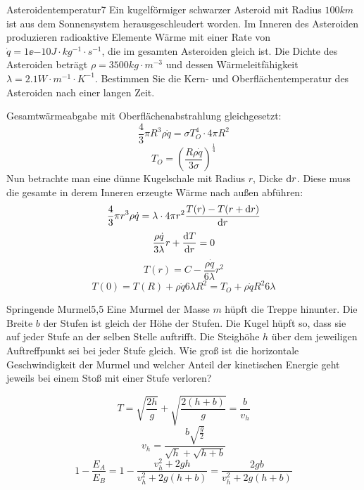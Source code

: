 \begin{problem}{Asteroidentemperatur}{7}
Ein kugelförmiger schwarzer Asteroid mit Radius $100 \unit{km}$ ist aus dem Sonnensystem herausgeschleudert worden. Im Inneren des Asteroiden produzieren radioaktive Elemente Wärme mit einer Rate von $\dot{q}=1 \ee{-10} \unit{J\cdot kg^{-1} \cdot s^{-1}}$, die im gesamten Asteroiden gleich ist. Die Dichte des Asteroiden beträgt $\rho=3500 \unit{kg \cdot m^{-3}}$ und dessen Wärmeleitfähigkeit $\lambda=2.1 \unit{W \cdot m^{-1} \cdot K^{-1}}$. Bestimmen Sie die Kern- und Oberflächentemperatur des Asteroiden nach einer langen Zeit.
\begin{solution}
Gesamtwärmeabgabe mit Oberflächenabstrahlung gleichgesetzt:
\[
\frac43 \pi R^3 \rho \dot{q}=\sigma T_O^4 \cdot 4\pi R^2
\]
\[
T_O=\left( \frac{R\rho \dot{q}}{3\sigma} \right)^\frac14
\]
Nun betrachte man eine dünne Kugelschale mit Radius $r$, Dicke $\mathrm{d} r$. Diese muss die gesamte in derem Inneren erzeugte Wärme nach außen abführen:
\[
\frac43 \pi r^3 \rho \dot{q}=\lambda \cdot 4\pi r^2 \frac{T(r)-T(r+\mathrm{d} r)}{\mathrm{d} r}
\]
\[
\frac{\rho \dot{q}}{3 \lambda}r+\frac{\mathrm{d} T}{\mathrm{d} r}=0
\]
\[
T(r)=C-\frac{\rho \dot{q}}{6 \lambda} r^2
\]
\[
T(0)=T(R)+{\rho \dot{q}}{6 \lambda}R^2=T_O+{\rho \dot{q} R^2}{6 \lambda}
\]
\end{solution}
\end{problem}

\begin{problem}{Springende Murmel}{5,5}
Eine Murmel der Masse $m$ hüpft die Treppe hinunter. Die Breite $b$ der Stufen ist gleich der Höhe der Stufen. Die Kugel hüpft so, dass sie auf jeder Stufe an der selben Stelle auftrifft. Die Steighöhe $h$ über dem jeweiligen Auftreffpunkt sei bei jeder Stufe gleich. Wie groß ist die horizontale Geschwindigkeit der Murmel und welcher Anteil der kinetischen Energie geht jeweils bei einem Stoß mit einer Stufe verloren?
\begin{solution}
\[
T=\sqrt{\frac{2h}{g}}+\sqrt{\frac{2(h+b)}{g}}=\frac{b}{v_h}
\]
\[
v_h=\frac{b\sqrt{\frac{g}{2}}}{\sqrt{h}+\sqrt{h+b}}
\]
\[
1-\frac{E_A}{E_B}=1-\frac{v_h^2+2gh}{v_h^2+2g(h+b)}=\frac{2gb}{v_h^2+2g(h+b)}
\]
\end{solution}
\end{problem}

